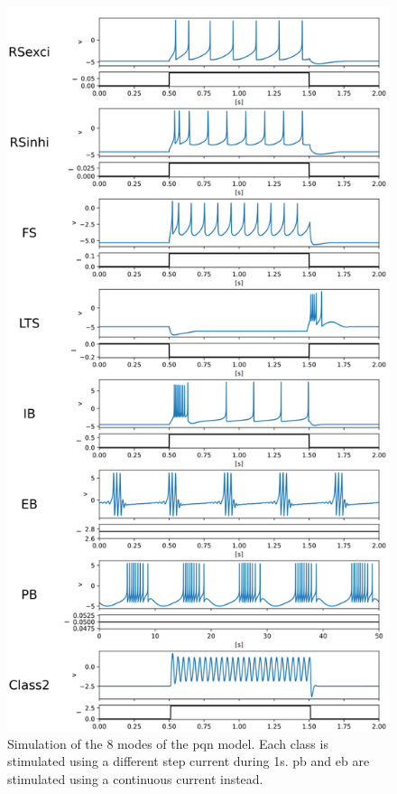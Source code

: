 \begin{figure}[hbt!]
    \begin{center}
    \includegraphics[width=0.65\linewidth]{img/all.png}
    \end{center}
    \caption[Stimulation of the 8 PQN model's modes]{Simulation of the 8 modes of the \acrshort{pqn} model. Each class is stimulated using a different step current during 1s. \acrshort{pb} and \acrshort{eb} are stimulated using a continuous current instead.}
    \label{fig:RSexci}
\end{figure}